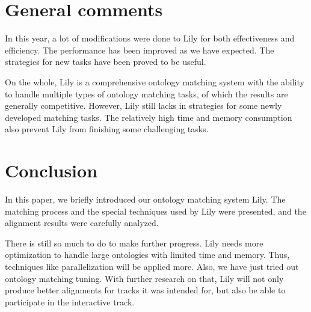 \documentclass{llncs}
\begin{document}
\section{General comments}
In this year, a lot of modifications were done to Lily for both effectiveness and efficiency. The performance has been improved as we have expected. The strategies for new tasks have been proved to be useful. \par
On the whole, Lily is a comprehensive ontology matching system with the ability to handle multiple types of ontology matching tasks, of which the results are generally competitive. However, Lily still lacks in strategies for some newly developed matching tasks. The relatively high time and memory consumption also prevent Lily from finishing some challenging tasks. \par

\section{Conclusion}
In this paper, we briefly introduced our ontology matching system Lily. The matching process and the special techniques used by Lily were presented, and the alignment results were carefully analyzed. \par
There is still so much to do to make further progress. Lily needs more optimization to handle large ontologies with limited time and memory. Thus, techniques like parallelization will be applied more. Also, we have just tried out ontology matching tuning. With further research on that, Lily will not only produce better alignments for tracks it was intended for, but also be able to participate in the interactive track. \par
\end{document}
